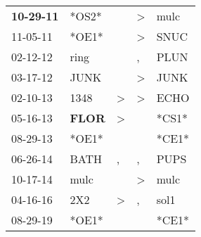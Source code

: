 \begin{supertabular}{p{0.07\textwidth}p{0.06\textwidth}p{0.02\textwidth}p{0.02\textwidth}p{0.06\textwidth}}
 \textbf{10-29-11\textsuperscript{}} &                            *OS2* &               &  \textgreater &  mulc\textsuperscript{} \\
          11-05-11\textsuperscript{} &                            *OE1* &               &  \textgreater &  SNUC\textsuperscript{} \\
          02-12-12\textsuperscript{} &           ring\textsuperscript{} &               &             , &  PLUN\textsuperscript{} \\
          03-17-12\textsuperscript{} &           JUNK\textsuperscript{} &               &  \textgreater &  JUNK\textsuperscript{} \\
          02-10-13\textsuperscript{} &           1348\textsuperscript{} &  \textgreater &  \textgreater &  ECHO\textsuperscript{} \\
          05-16-13\textsuperscript{} &  \textbf{FLOR\textsuperscript{}} &  \textgreater &               &                   *CS1* \\
          08-29-13\textsuperscript{} &                            *OE1* &               &               &                   *CE1* \\
          06-26-14\textsuperscript{} &           BATH\textsuperscript{} &             , &             , &  PUPS\textsuperscript{} \\
          10-17-14\textsuperscript{} &           mulc\textsuperscript{} &               &  \textgreater &  mulc\textsuperscript{} \\
          04-16-16\textsuperscript{} &            2X2\textsuperscript{} &  \textgreater &             , &  sol1\textsuperscript{} \\
          08-29-19\textsuperscript{} &                            *OE1* &               &               &                   *CE1* \\
\end{supertabular}
